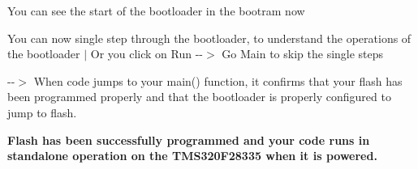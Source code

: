 You can see the start of the bootloader in the bootram now


\begin{DoxyEnumerate}
\item You can now single step through the bootloader, to understand the operations of the bootloader $\vert$ Or you click on Run -\/-\/$>$ Go Main to skip the single steps


\end{DoxyEnumerate}

-\/-\/$>$ When code jumps to your main() function, it confirms that your flash has been programmed properly and that the bootloader is properly configured to jump to flash. ~\newline


{\bfseries{Flash has been successfully programmed and your code runs in standalone operation on the T\+M\+S320\+F28335 when it is powered.}} 
